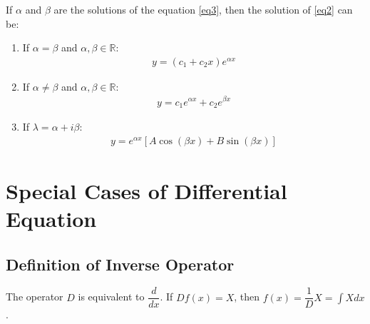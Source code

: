\documentclass[../main.tex]{subfile}
\begin{document}
        If $\alpha$ and $\beta$ are the solutions of the equation \ref{eq3}, then the solution of \ref{eq2} can be:
        \begin{enumerate}

        \item If $\alpha = \beta$ and $\alpha,\beta\in\mathbb{R}$:
        \begin{align}
            y = (c_1 + c_2 x) e^{\alpha x}
        \end{align}

        \item If $\alpha \neq \beta$ and $\alpha,\beta\in\mathbb{R}$:
        \begin{align}
            y = c_1 e^{\alpha x} + c_2 e^{\beta x}
        \end{align}

        \item If $\lambda = \alpha + i \beta$:
        \begin{align}
            y = e^{\alpha x} \left[ A \cos (\beta x) + B \sin (\beta x) \right]
        \end{align}

        \end{enumerate}

        \section{Special Cases of Differential Equation}
        \subsection{Definition of Inverse Operator}
        The operator $D$ is equivalent to $\dfrac{d}{dx}$. If $Df(x)=X$, then $f(x)=\dfrac{1}{D}X=\int X dx$.
\end{document}
